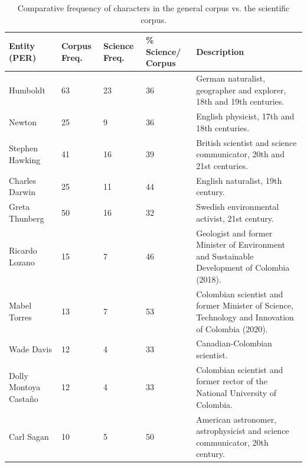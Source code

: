 \documentclass[11pt,a4paper]{article}
\begin{document}
	
	

	\begin{table}[H]
		\centering
		\caption{Comparative frequency of characters in the general corpus vs. the scientific corpus.}
		\label{tab:ents_per}
		\footnotesize 
		
		\begin{tabular}{p{3cm}P{2.2cm}P{2.2cm}P{2.2cm}p{5cm}}
			\toprule
			\textbf{Entity (PER)} & 
			\textbf{Corpus Freq.} & 
			\textbf{Science Freq.} & 
			\textbf{\% Science/ Corpus} & 
			\textbf{Description} \\
			\midrule
			Humboldt & 63 & 23 & 36 & German naturalist, geographer and explorer, 18th and 19th centuries. \\
			Newton & 25 & 9 & 36 & English physicist, 17th and 18th centuries. \\
			Stephen Hawking & 41 & 16 & 39 & British scientist and science communicator, 20th and 21st centuries. \\
			Charles Darwin & 25 & 11 & 44 & English naturalist, 19th century. \\
			Greta Thunberg & 50 & 16 & 32 & Swedish environmental activist, 21st century. \\
			Ricardo Lozano & 15 & 7 & 46 & Geologist and former Minister of Environment and Sustainable Development of Colombia (2018). \\
			Mabel Torres & 13 & 7 & 53 & Colombian scientist and former Minister of Science, Technology and Innovation of Colombia (2020). \\
			Wade Davis & 12 & 4 & 33 & Canadian-Colombian scientist. \\
			Dolly Montoya Castaño & 12 & 4 & 33 & Colombian scientist and former rector of the National University of Colombia. \\
			Carl Sagan & 10 & 5 & 50 & American astronomer, astrophysicist and science communicator, 20th century.\\
			
			\bottomrule
		\end{tabular}
	\end{table}
	
\end{document}
